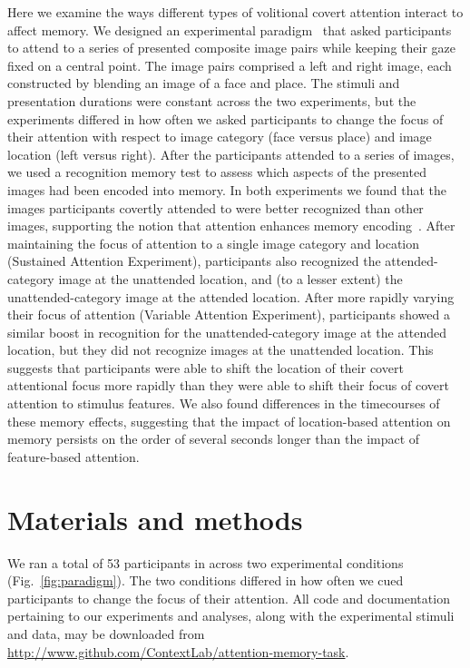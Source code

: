 \documentclass[english]{article}
\begin{document}
Here we examine the ways different types of volitional covert attention
interact to affect memory. We designed an experimental
paradigm~\citep[following][]{Posn80} that asked participants to attend to a
series of presented composite image pairs while keeping their gaze fixed on a
central point. The image pairs comprised a left and right image, each
constructed by blending an image of a face and place. The stimuli and
presentation durations were constant across the two experiments, but the
experiments differed in how often we asked participants to change the focus of
their attention with respect to image category (face versus place) and image
location (left versus right). After the participants attended to a series of
images, we used a recognition memory test to assess which aspects of the
presented images had been encoded into memory. In both experiments we found
that the images participants covertly attended to were better recognized than
other images, supporting the notion that attention enhances memory
encoding~\citep[i.e., they rated attended images as more familiar than
unattended images][]{Yone02}. After maintaining the focus of attention to a
single image category and location (Sustained Attention Experiment),
participants also recognized the attended-category image at the unattended
location, and (to a lesser extent) the unattended-category image at the
attended location. After more rapidly varying their focus of attention
(Variable Attention Experiment), participants showed a similar boost in
recognition for the unattended-category image at the attended location, but
they did not recognize images at the unattended location. This suggests that
participants were able to shift the location of their covert attentional focus
more rapidly than they were able to shift their focus of covert attention to
stimulus features. We also found differences in the timecourses of these memory
effects, suggesting that the impact of location-based attention on memory
persists on the order of several seconds longer than the impact of
feature-based attention.

\section*{Materials and methods}

We ran a total of 53 participants in across two experimental conditions
(Fig.~\ref{fig:paradigm}). The two conditions differed in how often we
cued participants to change the focus of their attention. All code and
documentation pertaining to our experiments and analyses, along with the
experimental stimuli and data, may be downloaded from
\url{http://www.github.com/ContextLab/attention-memory-task}.
\end{document}
